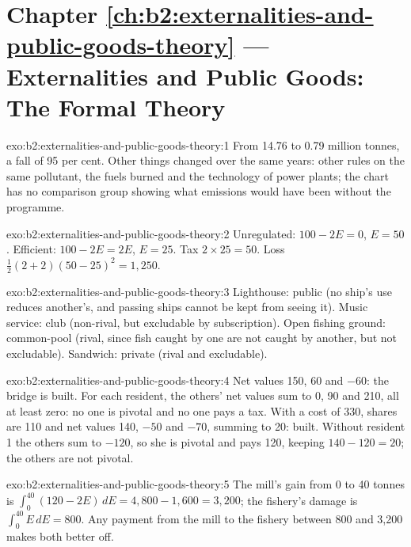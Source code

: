 \section*{Chapter \ref{ch:b2:externalities-and-public-goods-theory} --- Externalities and Public Goods: The Formal Theory}

\begin{solution}{exo:b2:externalities-and-public-goods-theory:1}
From 14.76 to 0.79 million tonnes, a fall of 95 per cent. Other things changed over the same years: other rules on the
same pollutant, the fuels burned and the technology of power plants; the chart has no comparison group showing what
emissions would have been without the programme.
\end{solution}

\begin{solution}{exo:b2:externalities-and-public-goods-theory:2}
Unregulated: $100 - 2E = 0$, $E = 50$. Efficient: $100 - 2E = 2E$, $E = 25$. Tax $2 \times 25 = 50$. Loss $\tfrac12(2 + 2)(50 - 25)^2 = 1{,}250$.
\end{solution}

\begin{solution}{exo:b2:externalities-and-public-goods-theory:3}
Lighthouse: public (no ship's use reduces another's, and passing ships cannot be kept from seeing it). Music service: club
(non-rival, but excludable by subscription). Open fishing ground: common-pool (rival, since fish caught by one are not
caught by another, but not excludable). Sandwich: private (rival and excludable).
\end{solution}

\begin{solution}{exo:b2:externalities-and-public-goods-theory:4}
Net values 150, 60 and $-60$: the bridge is built. For each resident, the others' net values sum to 0, 90 and 210, all at least zero:
no one is pivotal and no one pays a tax. With a cost of 330, shares are 110 and net values 140, $-50$ and $-70$, summing to 20: built.
Without resident 1 the others sum to $-120$, so she is pivotal and pays 120, keeping $140 - 120 = 20$; the others are not pivotal.
\end{solution}

\begin{solution}{exo:b2:externalities-and-public-goods-theory:5}
The mill's gain from 0 to 40 tonnes is $\int_0^{40}(120 - 2E)\,dE = 4{,}800 - 1{,}600 = 3{,}200$; the fishery's damage is $\int_0^{40}E\,dE = 800$. Any payment from the mill
to the fishery between 800 and 3{,}200 makes both better off.
\end{solution}


